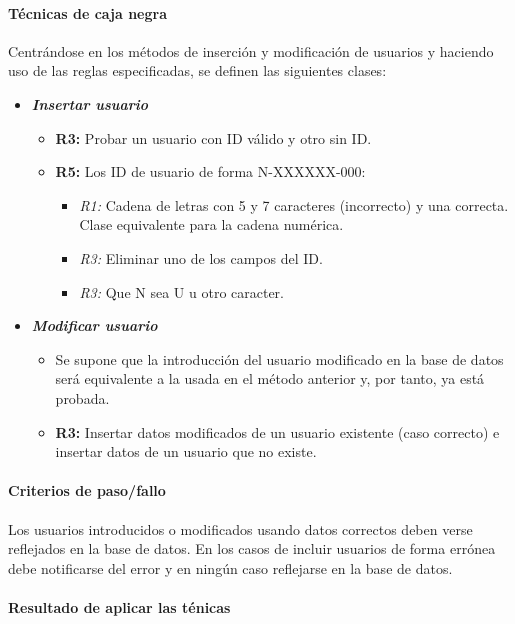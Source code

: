 \documentclass[10pt,a4paper]{article}
\begin{document}
			\paragraph{Técnicas de caja negra} Centrándose en los métodos de inserción y modificación de usuarios y haciendo uso de las reglas especificadas, se definen las siguientes clases:
			\begin{itemize}
				\item \textbf{\textit{Insertar usuario}}
					\begin{itemize}
						\item \textbf{R3:} Probar un usuario con ID válido y otro sin ID.
						\item \textbf{R5:} Los ID de usuario de forma N-XXXXXX-000:
							\begin{itemize}
								\item \textit{R1:} Cadena de letras con 5 y 7 caracteres (incorrecto) y una correcta. Clase equivalente para la cadena numérica.
								\item \textit{R3:} Eliminar uno de los campos del ID.
								\item \textit{R3:} Que N sea U u otro caracter.
							\end{itemize}
					\end{itemize}
				\item \textbf{\textit{Modificar usuario}}
					\begin{itemize}
						\item Se supone que la introducción del usuario modificado en la base de datos será equivalente a la usada en el método anterior y, por tanto, ya está probada.
						\item \textbf{R3: } Insertar datos modificados de un usuario existente (caso correcto) e insertar datos de un usuario que no existe.
					\end{itemize}
			\end{itemize}
			\paragraph{Criterios de paso/fallo} Los usuarios introducidos o modificados usando datos correctos deben verse reflejados en la base de datos.
			En los casos de incluir usuarios de forma errónea debe notificarse del error y en ningún caso reflejarse en la base de datos.
			\paragraph{Resultado de aplicar las ténicas}
\end{document}

